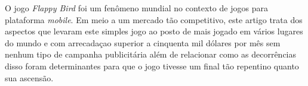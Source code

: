 O jogo \textit{Flappy Bird} foi um fenômeno mundial no contexto de jogos para plataforma \textit{mobile}. Em meio a um mercado tão competitivo, este artigo trata dos aspectos que levaram este simples jogo ao posto de mais jogado em vários lugares do mundo e com arrecadaçao superior a cinquenta mil dólares por mês sem nenhum tipo de campanha publicitária além de relacionar como as decorrências disso foram determinantes para que o jogo tivesse um final tão repentino quanto sua ascensão.